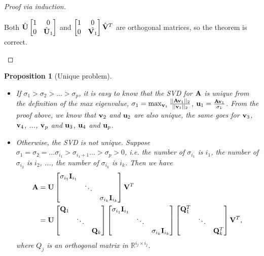 \documentclass[11pt]{article}
\def\A{{\bf A}}
\def\I{{\bf I}}
\def\U{{\bf U}}
\def\u{{\bf u}}
\def\V{{\bf V}}
\def\v{{\bf v}}
\def\Q{{\bf Q}}
\def\BR{{\mathbb R}}
\newtheorem{proposition}{Proposition}[section]
\begin{document}
\begin{proof}[Proof via induction]
\begin{enumerate}
       Both $\hat{\U} \begin{bmatrix} 1 & 0 \\ 0 & \hat{\U}_1 \end{bmatrix}$ and $\begin{bmatrix} 1 & 0 \\ 0 & \hat{\V_1} \end{bmatrix} \hat{\V}^T$ are orthogonal matrices,
       so the theorem is correct.
\end{enumerate}   
\end{proof}

\begin{proposition}[Unique problem]\hfill
 \begin{itemize}
  \item If $\sigma_1 > \sigma_2 > ... > \sigma_p$, it is easy to know that the SVD for $\A$ is unique from the definition of the max eigenvalue, 
  $\sigma_1 = \max_{\v_1} \frac{||\A\v_1||_2}{||\v_1||_2}$, $\u_1 = \frac{\A\v_1}{\sigma_1}$. 
  From the proof above, we know that $\v_2$ and $\u_2$ are also unique, the same goes for $\v_3$, $\v_4$, ..., $\v_p$ and $\u_3$, $\u_4$ and $\u_p$.
  \item
  Otherwise, the SVD is not unique. Suppose $\sigma_1 = \sigma_2 = ... \sigma_{i_1} > \sigma_{i_1+1} ... > \sigma_p > 0$, 
  i.e. the number of $\sigma_{i_1}$ is $i_1$, the number of $\sigma_{i_2}$ is $i_2$, ..., the number of $\sigma_{i_k}$ is $i_k$.
  Then we have
  \[\begin{aligned} 
      \A &= \U \begin{bmatrix} \sigma_{i_1}\I_{i_1} & & \\ & \ddots & \\ & & \sigma_{i_k}\I_{i_k} \end{bmatrix} \V^T  \\
	&= \U \begin{bmatrix} \Q_1 & & \\ & \ddots & \\ & & \Q_k \end{bmatrix} \begin{bmatrix} \sigma_{i_1}\I_{i_1} & & \\ & \ddots & \\ & & \sigma_{i_k}\I_{i_k} \end{bmatrix} \begin{bmatrix} \Q_1^T & & \\ & \ddots & \\ & & \Q_k^T \end{bmatrix} \V^T,
  \end{aligned}\]
  where $Q_j$ is an orthogonal matrix in $\BR^{i_j\times i_j}$. 
  

\end{itemize}
\end{proposition}
\end{document}
